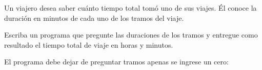 Un viajero desea saber cuánto tiempo total
tomó uno de sus viajes.
Él conoce la duración en mi\-nu\-tos
de cada uno de los tramos del viaje.

Escriba un programa que pregunte
las duraciones de los tramos
y entregue como resultado
el tiempo total de viaje
en horas y minutos.

El programa debe dejar de preguntar tramos
apenas se ingrese un cero:

\begin{minipage}[t]{.40\textwidth}
  
\end{minipage}
\quad
\begin{minipage}[t]{.40\textwidth}
  
\end{minipage}
